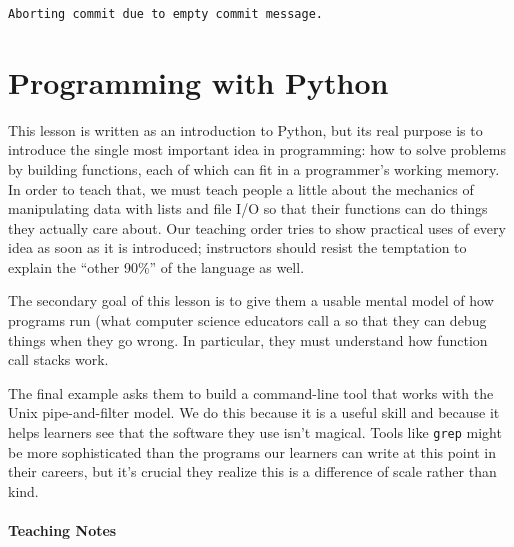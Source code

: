 \documentclass{book}
\begin{document}
\begin{verbatim}
Aborting commit due to empty commit message.
\end{verbatim}

\section{Programming with Python}

This lesson is written as an introduction to Python, but its real
purpose is to introduce the single most important idea in programming:
how to solve problems by building functions, each of which can fit in a
programmer's working memory. In order to teach that, we must teach
people a little about the mechanics of manipulating data with lists and
file I/O so that their functions can do things they actually care about.
Our teaching order tries to show practical uses of every idea as soon as
it is introduced; instructors should resist the temptation to explain
the ``other 90\%'' of the language as well.

The secondary goal of this lesson is to give them a usable mental model
of how programs run (what computer science educators call a
 so that they can debug
things when they go wrong. In particular, they must understand how
function call stacks work.

The final example asks them to build a command-line tool that works with
the Unix pipe-and-filter model. We do this because it is a useful skill
and because it helps learners see that the software they use isn't
magical. Tools like \texttt{grep} might be more sophisticated than the
programs our learners can write at this point in their careers, but it's
crucial they realize this is a difference of scale rather than kind.

\mbox{}\paragraph{Teaching Notes}
\end{document}
